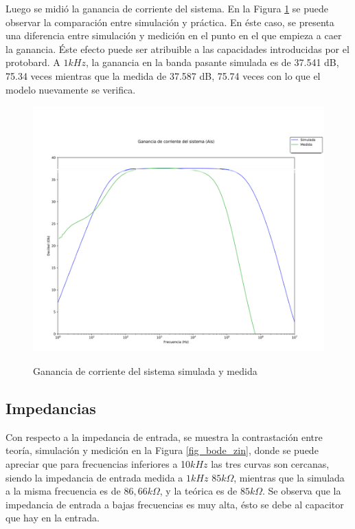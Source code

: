 Luego se midió la ganancia de corriente del sistema. En la Figura \ref{fig_bode_ais} se puede observar la comparación entre simulación y práctica. En éste caso, se presenta una diferencia entre simulación y medición en el punto en el que empieza a caer la ganancia. Éste efecto puede ser atribuible a las capacidades introducidas por el protobard. A $1kHz$, la ganancia en la banda pasante simulada es de 37.541 dB, 75.34 veces mientras que la medida de 37.587 dB, 75.74 veces con lo que el modelo nuevamente se verifica. 

	\begin{figure}[H]
		\centering
		\includegraphics[scale=0.65]{./Imagenes/bode_Ais.png} \\
		\caption{Ganancia de corriente del sistema simulada y medida}
		\label{fig_bode_ais}
	\end{figure}

\subsection{Impedancias}
Con respecto a la impedancia de entrada, se muestra la contrastación entre teoría, simulación y medición en la Figura \ref{fig_bode_zin}, donde se puede apreciar que para frecuencias inferiores a 10$kHz$ las tres curvas son cercanas, siendo la impedancia de entrada medida a 
$1kHz$ $85k\Omega$, mientras que la simulada a la misma frecuencia es de $86,66 k\Omega$, y la teórica es de $85k\Omega$. Se observa que la impedancia de entrada a bajas frecuencias es muy alta, ésto se debe al capacitor que hay en la entrada. 

